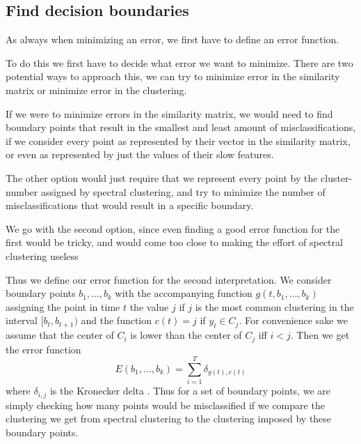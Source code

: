 \subsection{Find decision boundaries}
As always when minimizing an error, we first have to define an error function. 

To do this we first have to decide what error we want to minimize. There are two potential ways to approach this, we can try to minimize error in the similarity matrix or minimize error in the clustering. 

If we were to minimize errors in the similarity matrix, we would need to find boundary points that result in the smallest and least amount of misclassifications, if we consider every point as represented by their vector in the similarity matrix, or even as represented by just the values of their slow features.

The other option would just require that we represent every point by the cluster-number assigned by spectral clustering, and try to minimize the number of misclassifications  that would result in a specific boundary. 

We go with the second option, since even finding a good error function for the first would be tricky, and would come too close to making the effort of spectral clustering useless  

Thus we define our error function for the second interpretation. We consider boundary points $b_1,\ldots,b_k$ with the accompanying function $g(t,b_1,\ldots,b_k)$ assigning the point in time $t$ the value $j$ if $j$ is the most common clustering in the interval $[b_t,b_{t+1})$ and the function $c(t)=j$ if $y_t \in C_j$. For convenience sake we assume that the center of $C_i$ is lower than the center of $C_j$ iff  $i<j$. Then we get the error function 
\[
E(b_1,\ldots,b_k)=\sum_{i=1}^T \delta_{g(t),c(t)}
\]
where $\delta_{i,j}$ is the Kronecker delta . Thus for a set of boundary points, we are simply checking how many points would be misclassified if we compare the clustering we get from spectral clustering to the clustering imposed by these boundary points.

